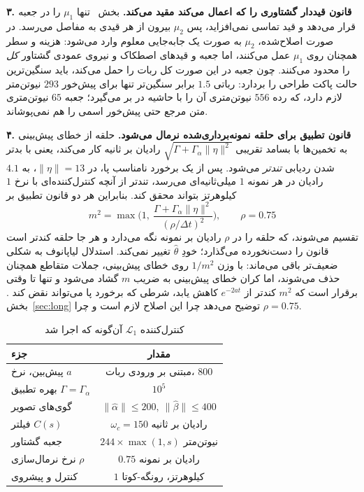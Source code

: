 \documentclass[10pt,twocolumn]{article}
\newcommand{\en}[1]{\lr{#1}}
\begin{document}
\textbf{۳. قانون قیددار گشتاوری را که اعمال می‌کند مقید می‌کند.} بخش~\en{4.2.3} تنها
$\mu_1$ را در جعبه قرار می‌دهد و قید تماسی نمی‌افزاید، پس $\mu_2$ بیرون از هر قیدی به
مفاصل می‌رسد. در صورت اصلاح‌شده، $\mu_2$ به صورت یک جابه‌جایی معلوم
وارد \en{QP} می‌شود: هزینه و سطر \en{CLF} همچنان روی $\mu_1$ عمل می‌کنند، اما جعبه و
قیدهای اصطکاک و نیروی عمودی گشتاور \emph{کل} را محدود می‌کنند. چون جعبه در این صورت کل
ربات را حمل می‌کند، باید سنگین‌ترین حالت پاکت طراحی را بردارد: رباتی $1.5$ برابر
سنگین‌تر تنها برای پیش‌خور $293$ نیوتن‌متر لازم دارد، که رده $556$ نیوتن‌متری آن را
با حاشیه در بر می‌گیرد؛ جعبه $65$ نیوتن‌متری متن مرجع حتی پیش‌خور اسمی را هم
نمی‌پوشاند.

\textbf{۴. قانون تطبیق برای حلقه نمونه‌برداری‌شده نرمال می‌شود.} حلقه از خطای
پیش‌بینی به تخمین‌ها با بسامد تقریبی $\sqrt{\Gamma+\Gamma_\alpha\|\eta\|^2}$ رادیان
بر ثانیه کار می‌کند، یعنی با بدتر شدن ردیابی \emph{تندتر} می‌شود. پس از یک برخورد
نامناسب پا، در $\|\eta\|=13$، به $4.1$ رادیان در هر نمونه $1$ میلی‌ثانیه‌ای می‌رسد،
تندتر از آنچه کنترل‌کننده‌ای با نرخ $1$ کیلوهرتز بتواند محقق کند. بنابراین هر دو
قانون تطبیق بر
\begin{equation}
    m^2 = \max\!\Big(1,\ \frac{\Gamma+\Gamma_\alpha\|\eta\|^2}{(\rho/\Delta t)^2}\Big),
    \qquad \rho = 0.75
    \label{eq:norm}
\end{equation}
تقسیم می‌شوند، که حلقه را در $\rho$ رادیان بر نمونه
نگه می‌دارد و هر جا حلقه کندتر است قانون را دست‌نخورده می‌گذارد؛ خودِ $\hat\theta$
تغییر نمی‌کند. استدلال لیاپانوف به شکلی ضعیف‌تر باقی می‌ماند: با وزن $1/m^2$ روی
خطای پیش‌بینی، جملات متقاطع همچنان حذف می‌شوند، اما کران خطای پیش‌بینی به ضریب
$m$ گشاد می‌شود و تنها تا وقتی برقرار است که $m^2$ کندتر از $e^{-2at}$ کاهش یابد،
شرطی که برخورد پا می‌تواند نقض کند \cite{ioannou1996robust}. بخش~\ref{sec:long}
توضیح می‌دهد چرا این اصلاح لازم است و چرا $\rho=0.75$.

\begin{table}[H]
    \centering
    \caption{کنترل‌کننده $\mathcal{L}_1$ آن‌گونه که اجرا شد}
    \label{tab:l1params}
    \small
    \begin{tabular}{lc}
        \toprule
        جزء & مقدار \\
        \midrule
        پیش‌بین، نرخ $a$ & مبتنی بر ورودی ربات، $800$ \\
        بهره تطبیق $\Gamma=\Gamma_\alpha$ & $10^5$ \\
        گوی‌های تصویر & $\|\hat\alpha\|\le200,\ \|\hat\beta\|\le400$ \\
        فیلتر $C(s)$ & $\omega_c=150$ رادیان بر ثانیه \\
        جعبه گشتاور & $244\times\max(1,s)$ نیوتن‌متر \\
        نرخ نرمال‌سازی $\rho$ & $0.75$ رادیان بر نمونه \\
        کنترل و پیشروی & $1$ کیلوهرتز، رونگه-کوتا \\
        \bottomrule
    \end{tabular}
\end{table}
\end{document}
